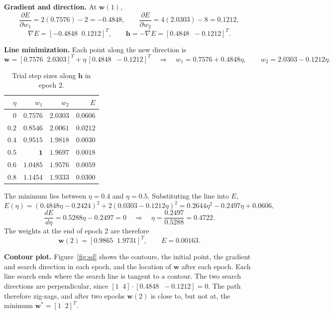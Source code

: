 \documentclass[11pt,letterpaper]{article}
\newcommand{\pd}[2]{\frac{\partial #1}{\partial #2}}
\begin{document}
\textbf{Gradient and direction.} At $\mathbf w(1)$,
\[
\pd{E}{w_1}=2(0.7576)-2=-0.4848,\qquad
\pd{E}{w_2}=4(2.0303)-8=0.1212 ,
\]
\[
\nabla E=[-0.4848\;\;0.1212]^{T},\qquad
\mathbf h=-\nabla E=[0.4848\;\;-0.1212]^{T}.
\]

\textbf{Line minimization.} Each point along the new direction is
\[
\mathbf w=[0.7576\;\;2.0303]^{T}+\eta\,[0.4848\;\;-0.1212]^{T}
\quad\Longrightarrow\quad
w_1=0.7576+0.4848\eta,\qquad w_2=2.0303-0.1212\eta .
\]

\begin{table}[H]
\centering
\caption{Trial step sizes along $\mathbf h$ in epoch 2.}
\renewcommand{\arraystretch}{1.2}
\begin{tabular}{rrrr}
\toprule
$\eta$ & $w_1$ & $w_2$ & $E$\\
\midrule
$0$   & $0.7576$ & $2.0303$ & $0.0606$\\
$0.2$ & $0.8546$ & $2.0061$ & $0.0212$\\
$0.4$ & $0.9515$ & $1.9818$ & $0.0030$\\
$\mathbf{0.5}$ & $\mathbf{1}$ & $\mathbf{1.9697}$ & $\mathbf{0.0018}$\\
$0.6$ & $1.0485$ & $1.9576$ & $0.0059$\\
$0.8$ & $1.1454$ & $1.9333$ & $0.0300$\\
\bottomrule
\end{tabular}
\end{table}

The minimum lies between $\eta=0.4$ and $\eta=0.5$. Substituting the line into $E$,
\[
E(\eta)=(0.4848\eta-0.2424)^2+2(0.0303-0.1212\eta)^2
=0.2644\eta^2-0.2497\eta+0.0606 ,
\]
\[
\frac{dE}{d\eta}=0.5288\eta-0.2497=0
\quad\Longrightarrow\quad \eta=\frac{0.2497}{0.5288}=0.4722 .
\]
The weights at the end of epoch 2 are therefore
\[
\boxed{\mathbf w(2)=[0.9865\;\;1.9731]^{T}},\qquad E=0.00163 .
\]

\textbf{Contour plot.} Figure~\ref{fig:sd} shows the contours, the initial
point, the gradient and search direction in each epoch, and the location of
$\mathbf w$ after each epoch. Each line search ends where the search line is
tangent to a contour. The two search directions are perpendicular, since
$[1\;\;4]\cdot[0.4848\;\;-0.1212]=0$. The path therefore zig-zags, and after two
epochs $\mathbf w(2)$ is close to, but not at, the minimum $\mathbf w^*=[1\;\;2]^{T}$.
\end{document}
